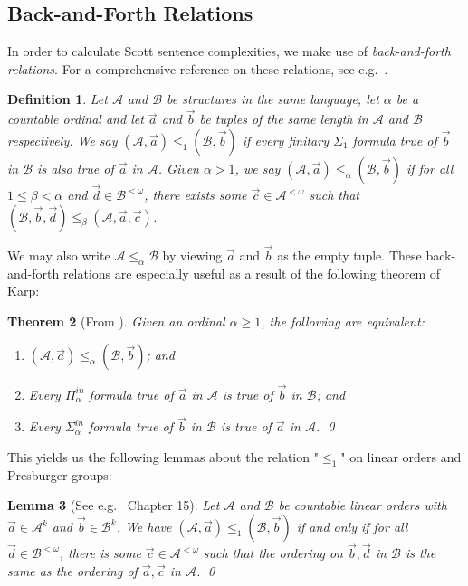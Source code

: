 \documentclass{amsart}%
\newtheorem{theorem}{Theorem}
\numberwithin{theorem}{section}
\newtheorem{definition}[theorem]{Definition}
\newtheorem{lemma}[theorem]{Lemma}
\newcommand{\A}{\mathcal{A}}
\newcommand{\B}{\mathcal{B}}
\newcommand{\0}{\emptyset}
\newcommand{\lom}{^{< \omega}}
\begin{document}
\subsection{Back-and-Forth Relations}

In order to calculate Scott sentence complexities, we make use of \emph{back-and-forth relations}. For a comprehensive reference on these relations, see e.g.\ \cite{AK-book}.

\begin{definition}
    Let $\A$ and $\B$ be structures in the same language, let $\alpha$ be a countable ordinal and let $\vec a$ and $\vec b$ be tuples of the same length in $\A$ and $\B$ respectively. We say $(\A, \vec a)\leq_1(\B,\vec b)$ if every finitary $\Sigma_1$ formula true of $\vec b$ in $\B$ is also true of $\vec a$ in $\A$. Given $\alpha>1$, we say $(\A,\vec a)\leq_\alpha (\B, \vec b)$ if for all $1\leq \beta<\alpha$ and $\vec d \in \B\lom$, there exists some $\vec c \in \A\lom$ such that $(\B,\vec b,\vec d) \leq_\beta (\A,\vec a,\vec c) $. 
\end{definition}

\noindent We may also write $\A\leq_\alpha \B$ by viewing $\vec a$ and $\vec b$ as the empty tuple.  These back-and-forth relations are especially useful as a result of the following theorem of Karp:

\begin{theorem}[From \cite{Karp}]
\label{karp}
    Given an ordinal $\alpha\geq 1$, the following are equivalent: 
    \begin{enumerate}
        \item $(\A,\vec a)\leq_\alpha (\B,\vec b)$; and
        \item Every $\Pi^{in}_\alpha$ formula true of $\vec a$ in $\A$ is true of $\vec b$ in $\B$; and
        \item Every $\Sigma^{in}_\alpha$ formula true of $\vec b$ in $\B$ is true of $\vec a$ in $\A$. \qed
    \end{enumerate}
\end{theorem}

This yields us the following lemmas about the relation "$\leq_1$" on linear orders and Presburger groups:

\begin{lemma}[See e.g.\ \cite{AK-book} Chapter 15]
\label{lemma same ordering}
    Let $\A$ and $\B$ be countable linear orders with $\vec a\in \A^k$ and $\vec b\in \B^k$. We have $(\A,\vec a)\leq_1(\B,\vec b)$ if and only if for all $\vec d\in \B\lom$, there is some $\vec c\in \A\lom$ such that the ordering on $\vec b,\vec d$ in $\B$ is the same as the ordering of $\vec a,\vec c$ in $\A$. \qed
\end{lemma}
\end{document}
